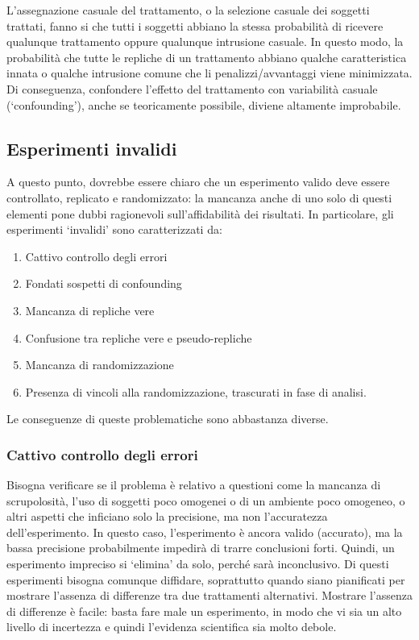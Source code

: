 \documentclass[
  12pt,
]{book}
\providecommand{\tightlist}{%
  \setlength{\itemsep}{0pt}\setlength{\parskip}{0pt}}
\begin{document}
L'assegnazione casuale del trattamento, o la selezione casuale dei soggetti trattati, fanno si che tutti i soggetti abbiano la stessa probabilità di ricevere qualunque trattamento oppure qualunque intrusione casuale. In questo modo, la probabilità che tutte le repliche di un trattamento abbiano qualche caratteristica innata o qualche intrusione comune che li penalizzi/avvantaggi viene minimizzata. Di conseguenza, confondere l'effetto del trattamento con variabilità casuale (`confounding'), anche se teoricamente possibile, diviene altamente improbabile.

\hypertarget{esperimenti-invalidi}{%
\subsection{Esperimenti invalidi}\label{esperimenti-invalidi}}

A questo punto, dovrebbe essere chiaro che un esperimento valido deve essere controllato, replicato e randomizzato: la mancanza anche di uno solo di questi elementi pone dubbi ragionevoli sull'affidabilità dei risultati. In particolare, gli esperimenti `invalidi' sono caratterizzati da:

\begin{enumerate}
\def\labelenumi{\arabic{enumi}.}
\tightlist
\item
  Cattivo controllo degli errori
\item
  Fondati sospetti di confounding
\item
  Mancanza di repliche vere
\item
  Confusione tra repliche vere e pseudo-repliche
\item
  Mancanza di randomizzazione
\item
  Presenza di vincoli alla randomizzazione, trascurati in fase di analisi.
\end{enumerate}

Le conseguenze di queste problematiche sono abbastanza diverse.

\hypertarget{cattivo-controllo-degli-errori}{%
\subsubsection{Cattivo controllo degli errori}\label{cattivo-controllo-degli-errori}}

Bisogna verificare se il problema è relativo a questioni come la mancanza di scrupolosità, l'uso di soggetti poco omogenei o di un ambiente poco omogeneo, o altri aspetti che inficiano solo la precisione, ma non l'accuratezza dell'esperimento. In questo caso, l'esperimento è ancora valido (accurato), ma la bassa precisione probabilmente impedirà di trarre conclusioni forti. Quindi, un esperimento impreciso si `elimina' da solo, perché sarà inconclusivo. Di questi esperimenti bisogna comunque diffidare, soprattutto quando siano pianificati per mostrare l'assenza di differenze tra due trattamenti alternativi. Mostrare l'assenza di differenze è facile: basta fare male un esperimento, in modo che vi sia un alto livello di incertezza e quindi l'evidenza scientifica sia molto debole.
\end{document}
